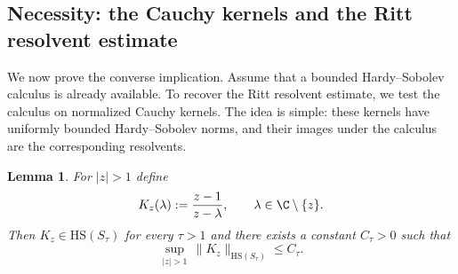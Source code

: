 \documentclass[11pt]{amsart}
\numberwithin{equation}{section}
\newtheorem{lemma}[theorem]{Lemma}
\theoremstyle{definition}
\theoremstyle{plain}
\newcommand{\HS}{\mathrm{HS}}
\begin{document}
\subsection{Necessity: the Cauchy kernels and the Ritt resolvent estimate}

We now prove the converse implication.  Assume that a bounded
Hardy--Sobolev calculus is already available.  To recover the Ritt resolvent
estimate, we test the calculus on normalized Cauchy kernels.  The idea is
simple: these kernels have uniformly bounded Hardy--Sobolev norms, and their
images under the calculus are the corresponding resolvents.

\begin{lemma}\label{lem:Kz-HS}
For $|z|>1$ define
\begin{equation}\label{ckernel}
  K_z(\lambda):=\frac{z-1}{z-\lambda},\qquad \lambda\in\C\setminus\{z\}.
\end{equation}
Then $K_z \in \HS(S_\tau)$ for every $\tau>1$
and there exists a constant $C_\tau>0$ such that
\begin{equation}\label{eq:Kz-HS-unif}
  \sup_{|z|>1}\,\|K_z\|_{\HS(S_\tau)}\le C_\tau.
\end{equation}
\end{lemma}
\end{document}
